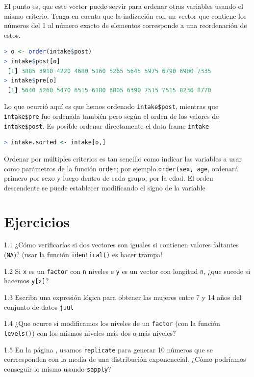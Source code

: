 \documentclass[spanish]{extbook}
\numberwithin{equation}{section}
\numberwithin{figure}{section}
\begin{document}
El punto es, que este vector puede servir para ordenar otras variables usando
el mismo criterio. Tenga en cuenta que la indización con un vector que contiene
los números del 1 al número exacto de elementos corresponde a una reordenación
de estos.

\begin{lstlisting}[language=R]
> o <- order(intake$post)
> intake$post[o]
 [1] 3885 3910 4220 4680 5160 5265 5645 5975 6790 6900 7335
> intake$pre[o]
 [1] 5640 5260 5470 6515 6180 6805 6390 7515 7515 8230 8770
\end{lstlisting}


Lo que ocurrió aquí es que hemos ordenado \texttt{intake\$post}, mientras que
\texttt{intake\$pre} fue ordenada también pero según el orden de los valores de
\texttt{intake\$post}. Es posible ordenar directamente el data frame
\texttt{intake}

\begin{lstlisting}[language=R]
> intake.sorted <- intake[o,]
\end{lstlisting}

Ordenar por múltiples criterios es tan sencillo como indicar las variables a
usar como parámetros de la función \texttt{order}; por ejemplo
\texttt{order(sex, age}, ordenará primero por sexo y luego dentro de cada
grupo, por la edad. El orden descendente se puede establecer modificando el
signo de la variable

\section{Ejercicios}

1.1 ¿Cómo verificarías si dos vectores son iguales si contienen valores
faltantes (\texttt{NA})? (usar la función \texttt{identical()} es hacer
trampa!

1.2 Si \texttt{x} es un \texttt{factor} con \texttt{n} niveles e \texttt{y} es
un vector con longitud \texttt{n}, ¿que sucede si hacemos \texttt{y[x]}?

1.3 Escriba una expresión lógica para obtener las mujeres entre 7 y 14 años del
conjunto de datos \texttt{juul}

1.4 ¿Que ocurre si modificamos los niveles de un \texttt{factor} (con la
función \texttt{levels()}) con los mismos niveles más dos o más niveles?

1.5 En la página \pageref{ciclosimplicitos}, usamos \texttt{replicate} para
generar 10 números que se corrresponden con la media de una distribución
exponenecial.  ¿Cómo podríamos conseguir lo mismo usando \texttt{sapply}?
\end{document}
